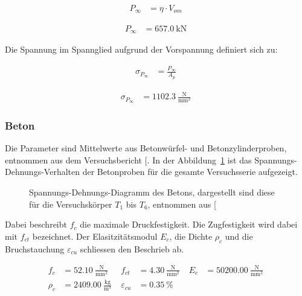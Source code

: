 \documentclass[
  11pt,
  letterpaper,
]{scrreprt}
\begin{document}
$$
\begin{aligned}
P_{\infty} &= \eta \cdot V_{om} \; 
\end{aligned}
$$

$$
\begin{aligned}
P_{\infty} &= 657.0\ \mathrm{kN} \;
\end{aligned}
$$

Die Spannung im Spannglied aufgrund der Vorspannung definiert sich zu:

$$
\begin{aligned}
\sigma_{P_{\infty}} &= \frac{ P_{\infty} }{ A_{p} } \; 
\end{aligned}
$$

$$
\begin{aligned}
\sigma_{P_{\infty}} &= 1102.3\ \frac{\mathrm{N}}{\mathrm{mm}^{2}} \;
\end{aligned}
$$

\subsubsection{Beton}\label{beton}

Die Parameter sind Mittelwerte aus Betonwürfel- und Betonzylinderproben,
entnommen aus dem Versuchsbericht
{[}\citeproc{ref-sigrist_versuche_1993}{5}{]}. In der
Abbildung~\ref{fig-sigma_eps_beton} ist das Spannungs-Dehnungs-Verhalten
der Betonproben für die gesamte Versuchsserie aufgezeigt.

\begin{figure}[H]


\caption{\label{fig-sigma_eps_beton}Spannungs-Dehnungs-Diagramm des
Betons, dargestellt sind diese für die Versuchskörper \(T_1\) bis
\(T_6\), entnommen aus {[}\citeproc{ref-sigrist_versuche_1993}{5}{]}}

\end{figure}%

Dabei beschreibt \(f_c\) die maximale Druckfestigkeit. Die Zugfestigkeit
wird dabei mit \(f_{ct}\) bezeichnet. Der Elasitzitätsmodul \(E_c\), die
Dichte \(\rho_c\) und die Bruchstauchung \(\varepsilon_{cu}\) schliessen
den Beschrieb ab.

$$
\begin{aligned}
f_{c} &= 52.10\ \frac{\mathrm{N}}{\mathrm{mm}^{2}} \; 
 &f_{ct} &= 4.30\ \frac{\mathrm{N}}{\mathrm{mm}^{2}} \; 
 &E_{c} &= 50200.00\ \frac{\mathrm{N}}{\mathrm{mm}^{2}} \; 
\\[10pt]
 \rho_{c} &= 2409.00\ \frac{\mathrm{kg}}{\mathrm{m}^{3}} \; 
 &\varepsilon_{cu} &= 0.35\ \mathrm{\%} \;
\end{aligned}
$$
\end{document}
